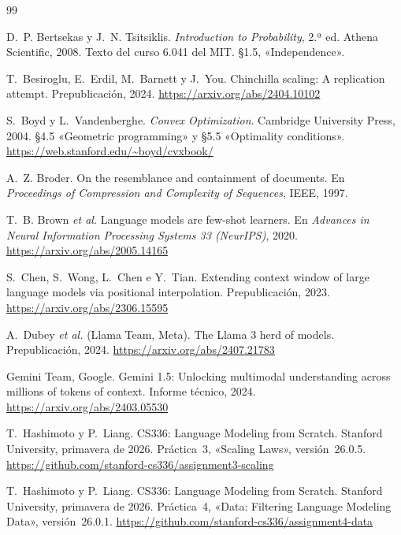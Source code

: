 \begin{thebibliography}{99}
\small
\def\UrlBreaks{\do\/\do-}

D.~P. Bertsekas y J.~N. Tsitsiklis.
\newblock \emph{Introduction to Probability}, 2.ª ed.
\newblock Athena Scientific, 2008.
\newblock Texto del curso 6.041 del MIT. §1.5, «Independence».

T.~Besiroglu, E.~Erdil, M.~Barnett y J.~You.
\newblock Chinchilla scaling: A replication attempt.
\newblock Prepublicación, 2024.
\newblock \url{https://arxiv.org/abs/2404.10102}

S.~Boyd y L.~Vandenberghe.
\newblock \emph{Convex Optimization}.
\newblock Cambridge University Press, 2004.
\newblock §4.5 «Geometric programming» y §5.5 «Optimality conditions».
\newblock \url{https://web.stanford.edu/~boyd/cvxbook/}

A.~Z. Broder.
\newblock On the resemblance and containment of documents.
\newblock En \emph{Proceedings of Compression and Complexity of Sequences}, IEEE, 1997.

T.~B. Brown \emph{et al.}
\newblock Language models are few-shot learners.
\newblock En \emph{Advances in Neural Information Processing Systems 33 (NeurIPS)}, 2020.
\newblock \url{https://arxiv.org/abs/2005.14165}

S.~Chen, S.~Wong, L.~Chen e Y.~Tian.
\newblock Extending context window of large language models via positional interpolation.
\newblock Prepublicación, 2023.
\newblock \url{https://arxiv.org/abs/2306.15595}

A.~Dubey \emph{et al.} (Llama Team, Meta).
\newblock The Llama 3 herd of models.
\newblock Prepublicación, 2024.
\newblock \url{https://arxiv.org/abs/2407.21783}

Gemini Team, Google.
\newblock Gemini 1.5: Unlocking multimodal understanding across millions of tokens of context.
\newblock Informe técnico, 2024.
\newblock \url{https://arxiv.org/abs/2403.05530}

T.~Hashimoto y P.~Liang.
\newblock CS336: Language Modeling from Scratch.
\newblock Stanford University, primavera de 2026. Práctica~3, «Scaling Laws», versión~26.0.5.
\newblock \url{https://github.com/stanford-cs336/assignment3-scaling}

T.~Hashimoto y P.~Liang.
\newblock CS336: Language Modeling from Scratch.
\newblock Stanford University, primavera de 2026. Práctica~4, «Data: Filtering Language Modeling Data», versión~26.0.1.
\newblock \url{https://github.com/stanford-cs336/assignment4-data}


\end{thebibliography}
